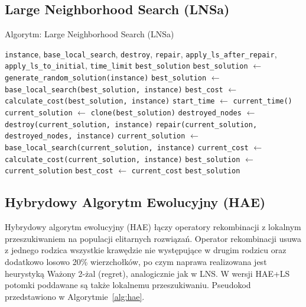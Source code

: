 \documentclass[12pt,a4paper]{article}
\begin{document}
\subsection{Large Neighborhood Search (LNSa)}
\begin{algorithm}[H]
\caption{Algorytm: Large Neighborhood Search (LNSa)}
\label{alg:lnsa}
\begin{algorithmic}[1]
\Require \texttt{instance}, \texttt{base\_local\_search}, \texttt{destroy}, \texttt{repair}, \texttt{apply\_ls\_after\_repair}, \texttt{apply\_ls\_to\_initial}, \texttt{time\_limit}
\Ensure \texttt{best\_solution}
\State \texttt{best\_solution} $\leftarrow$ \texttt{generate\_random\_solution(instance)}
    \State \texttt{best\_solution} $\leftarrow$ \texttt{base\_local\_search(best\_solution, instance)}
\EndIf
\State \texttt{best\_cost} $\leftarrow$ \texttt{calculate\_cost(best\_solution, instance)}
\State \texttt{start\_time} $\leftarrow$ \texttt{current\_time()}
    \State \texttt{current\_solution} $\leftarrow$ \texttt{clone(best\_solution)}
    \State \texttt{destroyed\_nodes} $\leftarrow$ \texttt{destroy(current\_solution, instance)}
    \State \texttt{repair(current\_solution, destroyed\_nodes, instance)} 
        \State \texttt{current\_solution} $\leftarrow$ \texttt{base\_local\_search(current\_solution, instance)}
    \EndIf
    \State \texttt{current\_cost} $\leftarrow$ \texttt{calculate\_cost(current\_solution, instance)}
        \State \texttt{best\_solution} $\leftarrow$ \texttt{current\_solution}
        \State \texttt{best\_cost} $\leftarrow$ \texttt{current\_cost}
    \EndIf
\EndWhile
\State \Return \texttt{best\_solution}
\end{algorithmic}
\end{algorithm}

\subsection{Hybrydowy Algorytm Ewolucyjny (HAE)}
Hybrydowy algorytm ewolucyjny (HAE) łączy operatory rekombinacji z lokalnym przeszukiwaniem na populacji elitarnych rozwiązań. Operator rekombinacji usuwa z jednego rodzica wszystkie krawędzie nie występujące w drugim rodzicu oraz dodatkowo losowo 20\% wierzchołków, po czym naprawa realizowana jest heurystyką Ważony 2-żal (regret), analogicznie jak w LNS. W wersji HAE+LS potomki poddawane są także lokalnemu przeszukiwaniu. Pseudokod przedstawiono w Algorytmie~\ref{alg:hae}.
\end{document}
